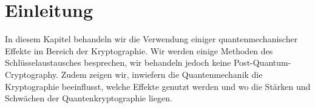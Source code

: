 \section{Einleitung}
  In diesem Kapitel behandeln wir die Verwendung einiger quantenmechanischer Effekte im Bereich der Kryptographie.
  Wir werden einige Methoden des Schl\"usselaustausches besprechen, wir behandeln jedoch keine Post-Quantum-Cryptography.
  Zudem zeigen wir, inwiefern die Quantenmechanik die Kryptographie beeinflusst,
  welche Effekte genutzt werden und wo die St\"arken und Schw\"achen der Quantenkryptographie liegen.

